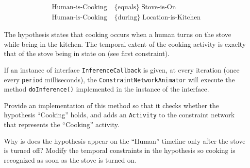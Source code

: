 \documentclass[a4paper]{article}
\begin{document}
\begin{align}
\text{Human-is-Cooking} &\;\{\text{equals}\}\; \text{Stove-is-On}\nonumber\\
\text{Human-is-Cooking} &\;\{\text{during}\}\; \text{Location-is-Kitchen}\nonumber
\end{align} 

The hypothesis states that cooking occurs when a human turns on the stove while being in the kitchen.  The temporal extent of the cooking activity is exaclty that of the stove being in state on (see first constraint).

If an instance of interface {\tt InferenceCallback} is given, at every iteration (once every {\tt period} milliseconds), the {\tt ConstraintNetworkAnimator} will execute the method {\tt doInference()} implemented in the instance of the interface.

{\ex{}\label{ex:ex10}
Provide an implementation of this method so that it checks whether the hypothesis ``Cooking'' holds, and adds an {\tt Activity} to the constraint network that represents the ``Cooking'' activity.
\vspace{0.1cm}}

{\ex{}\label{ex:ex11}
Why is does the hypothesis appear on the ``Human'' timeline only after the stove is turned off? Modify the temporal constraints in the hypothesis so cooking is recognized as soon as the stove is turned on.
\vspace{0.1cm}}

%
%
\end{document}
